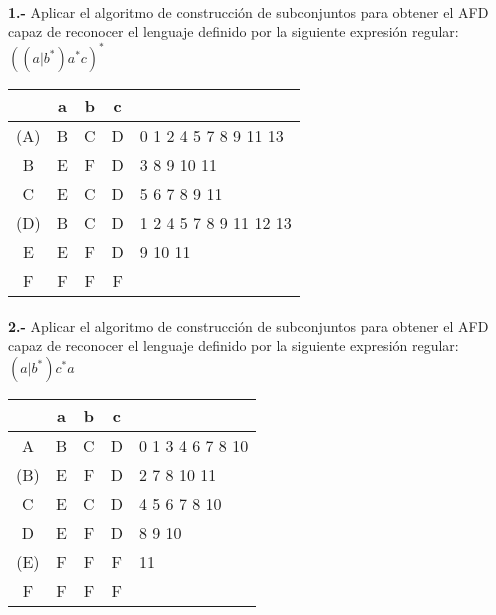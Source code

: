 \documentclass[11pt,a4paper]{report}
\begin{document}
\paragraph{}

\paragraph{}
\textbf{1.-} Aplicar el algoritmo de construcción de subconjuntos para obtener el AFD capaz de reconocer el lenguaje definido por la siguiente expresión regular: \textbf{$ ((a|b^*)a^*c)^* $} \\

\begin{tabular} {| c | c |c |c | l |}
\hline 
& a & b & c & \\ \hline
(A) & B & C & D & 0 1 2 4 5 7 8 9 11 13 \\ \hline
B & E & F & D & 3 8 9 10 11 \\ \hline
C & E & C & D & 5 6 7 8 9 11 \\ \hline
(D) & B & C & D & 1 2 4 5 7 8 9 11 12 13 \\ \hline
E & E & F & D & 9 10 11 \\ \hline
F & F & F & F & \\ \hline
\end{tabular}\paragraph{}
\textbf{2.-} Aplicar el algoritmo de construcción de subconjuntos para obtener el AFD capaz de reconocer el lenguaje definido por la siguiente expresión regular: \textbf{$ (a|b^*)c^*a $} \\

\begin{tabular} {| c | c |c |c | l |}
\hline 
& a & b & c & \\ \hline
A & B & C & D & 0 1 3 4 6 7 8 10 \\ \hline
(B) & E & F & D & 2 7 8 10 11 \\ \hline
C & E & C & D & 4 5 6 7 8 10 \\ \hline
D & E & F & D & 8 9 10 \\ \hline
(E) & F & F & F & 11 \\ \hline
F & F & F & F & \\ \hline
\end{tabular}
\end{document}
